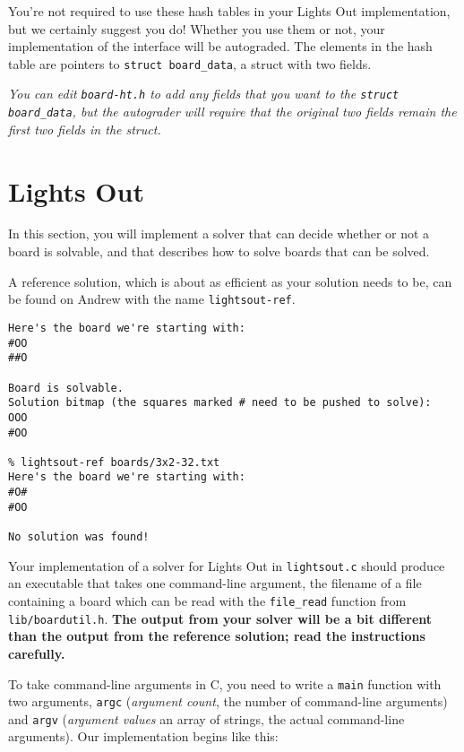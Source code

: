 \documentclass[12pt]{exam}
\begin{document}
You're not required to use these hash tables in your Lights Out
implementation, but we certainly suggest you do!  Whether you use them or
not, your implementation of the interface will be autograded. The
elements in the hash table are pointers to \lstinline'struct board_data', a
struct with two fields.

\emph{You can edit \lstinline'board-ht.h' to add any fields that
  you want to the \lstinline'struct board_data', but the autograder
  will require that the original two fields remain the first two
  fields in the struct.}


\clearpage
\section{Lights Out}

In this section, you will implement a solver that can decide whether
or not a board is solvable, and that describes how to solve boards
that can be solved.

A reference solution, which is about as efficient as your solution
needs to be, can be found on Andrew with the name
\lstinline'lightsout-ref'.

\begin{lstlisting}[language={[coin]C}, deletestring={[b]{'}}]
% lightsout-ref boards/3x2-34.txt
Here's the board we're starting with:
#OO
##O

Board is solvable.
Solution bitmap (the squares marked # need to be pushed to solve):
OOO
#OO

% lightsout-ref boards/3x2-32.txt
Here's the board we're starting with:
#O#
#OO

No solution was found!
\end{lstlisting}

Your implementation of a solver for Lights Out in
\lstinline'lightsout.c' should produce an executable that takes one
command-line argument, the filename of a file containing a board which
can be read with the \lstinline'file_read' function from
\lstinline'lib/boardutil.h'. \textbf{The output from your solver will
  be a bit different than the output from the reference solution; read
  the instructions carefully.}

To take command-line arguments in C, you need to write a
\lstinline'main' function with two arguments, \lstinline'argc'
(\emph{argument count}, the number of command-line arguments) and
\lstinline'argv' (\emph{argument values} an array of strings, the
actual command-line arguments). Our implementation begins like this:
\end{document}

